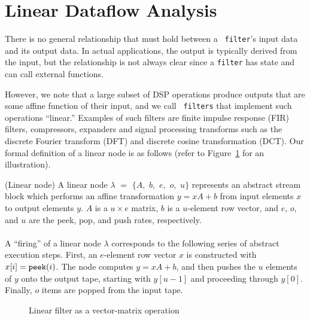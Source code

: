 \section{Linear Dataflow Analysis}
\label{sec:linearrep}

There is no general relationship that must hold between a {\tt
filter}'s input data and its output data. In actual applications, the
output is typically derived from the input, but the relationship is
not always clear since a {\tt filter} has state and can call external
functions.

However, we note that a large subset of DSP operations produce outputs
that are some affine function of their input, and we call {\tt
filters} that implement such operations ``linear.''  Examples of such
filters are finite impulse response (FIR) filters, compressors,
expanders and signal processing transforms such as the discrete
Fourier transform (DFT) and discrete cosine transformation (DCT).  Our
formal definition of a linear node is as follows (refer to
Figure~\ref{fig:overview-matrix} for an illustration).

\begin{definition}(Linear node)
A linear node $\lambda$ $=$ $\{A,$ $b,$ $e,$ $o,$ $u\}$ represents an
abstract stream block which performs an affine transformation $y = x A
+ b$ from input elements $x$ to output elements $y$.  $A$ is a $u
\times e$ matrix, $b$ is a $u$-element row vector, and $e$, $o$, and
$u$ are the peek, pop, and push rates, respectively. \\ ~ \\
%
A ``firing'' of a linear node $\lambda$ corresponds to the following
series of abstract execution steps.  First, an $e$-element row vector
$x$ is constructed with $x[i] = \mbox{\tt peek}(i)$.  The node
computes $y = x A + b$, and then pushes the $u$ elements of $y$ onto
the output tape, starting with $y[u-1]$ and proceeding through $y[0]$.
Finally, $o$ items are popped from the input tape.
\end{definition}

\begin{figure}[t]
\center
\epsfxsize=3.0in
\vspace{-12pt}
\caption{Linear filter as a vector-matrix operation}
\label{fig:overview-matrix}
\vspace{-12pt}
\end{figure}


